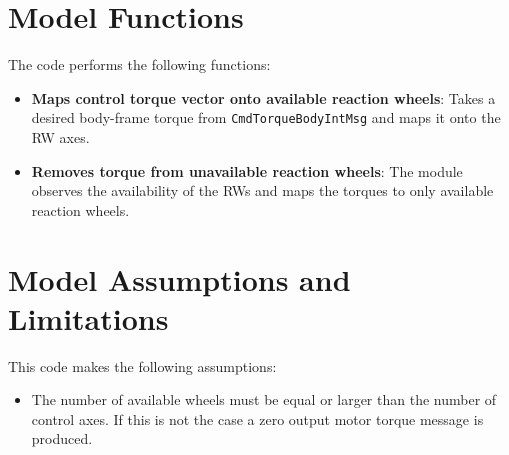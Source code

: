 

\section{Model Functions}
The code performs the following functions:
\begin{itemize}
	\item \textbf{Maps control torque vector onto available reaction wheels}: Takes a desired body-frame torque from  \verb~CmdTorqueBodyIntMsg~ and maps it onto the RW axes. 
	\item \textbf{Removes torque from unavailable reaction wheels}: The module observes the availability of the RWs and maps the torques to only available reaction wheels. 
\end{itemize}


\section{Model Assumptions and Limitations}
This code makes the following assumptions:
\begin{itemize}
	\item The number of available wheels must be equal or larger than the number of control axes.  If this is not the case a zero output motor torque message is produced.
\end{itemize}